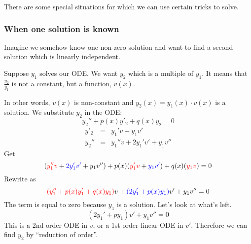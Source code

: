 \documentclass{article}
\newcommand{\tmcolor}[2]{{\color{#1}{#2}}}
\newcommand{\tmtextbf}[1]{\text{{\bfseries{#1}}}}
\begin{document}
There are some special situations for which we can use certain tricks to
solve.

\subsubsection{When one solution is known}

Imagine we somehow know one non-zero solution and want to find a second
solution which is linearly independent.

Suppose $y_1$ solves our ODE. We want $y_2$ which is \tmtextbf{not} a multiple
of $y_1$. It means that $\frac{y_2}{y_1}$ is not a constant, but a function,
$v (x)$.

In other words, $v (x)$ is non-constant and $y_2 (x) = y_1 (x) \cdot v (x)$ is
a solution. We substitute $y_2$ in the ODE:
\[ y_2'' + p (x) y'_2 + q (x) y_2 = 0 \]
\begin{eqnarray*}
  y'_2 & = & y_1' v + y_1 v'\\
  y_2'' & = & y_1'' v + 2 y_1' v' + y_1 v''
\end{eqnarray*}
Get
\[ (\tmcolor{red}{y_1'' v} + \tmcolor{blue}{2 y_1' v'} + y_1 v'') + p (x) 
   (\tmcolor{red}{y_1' v} + \tmcolor{blue}{y_1 v'}) + q (x) 
   (\tmcolor{red}{y_1 v}) = 0 \]
Rewrite as
\[ \tmcolor{red}{(y_1'' + p (x) y'_1 + q (x) y_1)} v + \tmcolor{blue}{(2 y_1'
   + p (x) y_1)} v' + y_1 v'' = 0 \]
The \tmcolor{red}{red} term is equal to zero because $y_1$ is a solution.
Let's look at what's left.
\[ (2 y_1' + py_1) v' + y_1 v'' = 0 \]
This is a 2nd order ODE in $v$, or a 1st order linear ODE in $v'$. Therefore
we can find $y_2$ by ``reduction of order''.
\end{document}
